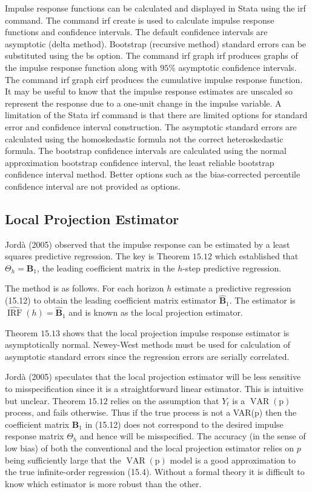 \documentclass[10pt]{article}
\begin{document}
Impulse response functions can be calculated and displayed in Stata using the irf command. The command irf create is used to calculate impulse response functions and confidence intervals. The default confidence intervals are asymptotic (delta method). Bootstrap (recursive method) standard errors can be substituted using the bs option. The command irf graph irf produces graphs of the impulse response function along with $95 \%$ asymptotic confidence intervals. The command irf graph cirf produces the cumulative impulse response function. It may be useful to know that the impulse response estimates are unscaled so represent the response due to a one-unit change in the impulse variable. A limitation of the Stata irf command is that there are limited options for standard error and confidence interval construction. The asymptotic standard errors are calculated using the homoskedastic formula not the correct heteroskedastic formula. The bootstrap confidence intervals are calculated using the normal approximation bootstrap confidence interval, the least reliable bootstrap confidence interval method. Better options such as the bias-corrected percentile confidence interval are not provided as options.

\subsection{Local Projection Estimator}
Jordà (2005) observed that the impulse response can be estimated by a least squares predictive regression. The key is Theorem $15.12$ which established that $\Theta_{h}=\boldsymbol{B}_{1}$, the leading coefficient matrix in the $h$-step predictive regression.

The method is as follows. For each horizon $h$ estimate a predictive regression (15.12) to obtain the leading coefficient matrix estimator $\widehat{\boldsymbol{B}}_{1}$. The estimator is $\widehat{\operatorname{IRF}}(h)=\widehat{\boldsymbol{B}}_{1}$ and is known as the local projection estimator.

Theorem $15.13$ shows that the local projection impulse response estimator is asymptotically normal. Newey-West methods must be used for calculation of asymptotic standard errors since the regression errors are serially correlated.

Jordà (2005) speculates that the local projection estimator will be less sensitive to misspecification since it is a straightforward linear estimator. This is intuitive but unclear. Theorem $15.12$ relies on the assumption that $Y_{t}$ is a $\operatorname{VAR}(\mathrm{p})$ process, and fails otherwise. Thus if the true process is not a VAR(p) then the coefficient matrix $\boldsymbol{B}_{1}$ in (15.12) does not correspond to the desired impulse response matrix $\Theta_{h}$ and hence will be misspecified. The accuracy (in the sense of low bias) of both the conventional and the local projection estimator relies on $p$ being sufficiently large that the $\operatorname{VAR}(\mathrm{p})$ model is a good approximation to the true infinite-order regression (15.4). Without a formal theory it is difficult to know which estimator is more robust than the other.
\end{document}
